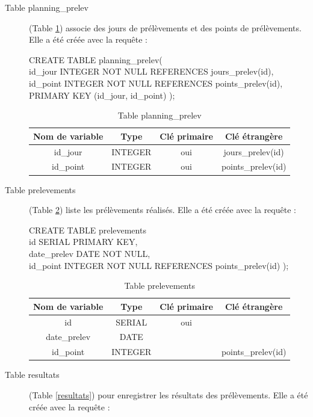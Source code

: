 \documentclass[12pt,a4paper,oneside]{article}
\begin{document}
\begin{description}
\item[Table planning\_prelev] (Table \ref{planning}) associe des jours de prélèvements et des points de prélèvements. Elle a été créée avec la requête :
\begin{tabbing}
CREATE TABLE planning\_prelev(\\
id\_jour INTEGER NOT NULL REFERENCES jours\_prelev(id),\\
id\_point INTEGER NOT NULL REFERENCES points\_prelev(id),\\
PRIMARY KEY (id\_jour, id\_point)
);
\end{tabbing}
\begin{table}
\caption{Table planning\_prelev \label{planning}}
\begin{center}
\begin{tabular}{|c|c|c|c|}
	\hline
	\textbf{Nom de variable} & \textbf{Type} & \textbf{Clé primaire} & \textbf{Clé étrangère}\\
	\hline
	id\_jour & INTEGER & oui & jours\_prelev(id)\\
	id\_point & INTEGER & oui & points\_prelev(id)\\
	\hline
\end{tabular}
\end{center}
\end{table}

\item[Table prelevements] (Table \ref{prelevements}) liste les prélèvements réalisés. Elle a été créée avec la requête :
\begin{tabbing}
CREATE TABLE prelevements\\
id SERIAL PRIMARY KEY,\\
date\_prelev DATE NOT NULL,\\
id\_point INTEGER NOT NULL REFERENCES points\_prelev(id)
);
\end{tabbing}
\begin{table}
\caption{Table prelevements \label{prelevements}}
\begin{center}
\begin{tabular}{|c|c|c|c|}
	\hline
	\textbf{Nom de variable} & \textbf{Type} & \textbf{Clé primaire} & \textbf{Clé étrangère}\\
	\hline
	id & SERIAL & oui & \\
	date\_prelev & DATE & &\\
	id\_point & INTEGER & & points\_prelev(id)\\
	\hline
\end{tabular}
\end{center}
\end{table}
\newpage
\item[Table resultats] (Table \ref{resultats}) pour enregistrer les résultats des prélèvements. Elle a été créée avec la requête :


\end{description}
\end{document}
